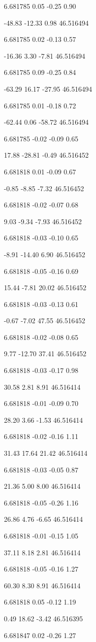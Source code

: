 6.681785
0.05
-0.25
0.90

-48.83
-12.33
0.98
46.516494

6.681785
0.02
-0.13
0.57

-16.36
3.30
-7.81
46.516494

6.681785
0.09
-0.25
0.84

-63.29
16.17
-27.95
46.516494

6.681785
0.01
-0.18
0.72

-62.44
0.06
-58.72
46.516494

6.681785
-0.02
-0.09
0.65

17.88
-28.81
-0.49
46.516452

6.681818
0.01
-0.09
0.67

-0.85
-8.85
-7.32
46.516452

6.681818
-0.02
-0.07
0.68

9.03
-9.34
-7.93
46.516452

6.681818
-0.03
-0.10
0.65

-8.91
-14.40
6.90
46.516452

6.681818
-0.05
-0.16
0.69

15.44
-7.81
20.02
46.516452

6.681818
-0.03
-0.13
0.61

-0.67
-7.02
47.55
46.516452

6.681818
-0.02
-0.08
0.65

9.77
-12.70
37.41
46.516452

6.681818
-0.03
-0.17
0.98

30.58
2.81
8.91
46.516414

6.681818
-0.01
-0.09
0.70

28.20
3.66
-1.53
46.516414

6.681818
-0.02
-0.16
1.11

31.43
17.64
21.42
46.516414

6.681818
-0.03
-0.05
0.87

21.36
5.00
8.00
46.516414

6.681818
-0.05
-0.26
1.16

26.86
4.76
-6.65
46.516414

6.681818
-0.01
-0.15
1.05

37.11
8.18
2.81
46.516414

6.681818
-0.05
-0.16
1.27

60.30
8.30
8.91
46.516414

6.681818
0.05
-0.12
1.19

0.49
18.62
-3.42
46.516395

6.681847
0.02
-0.26
1.27

